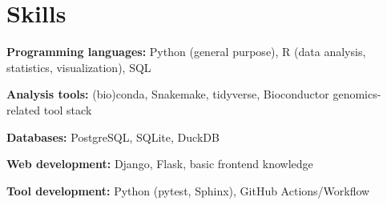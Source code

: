 \section{Skills}

\begin{entrylist}[itemsep=0.5ex]

\item \textbf{Programming languages:}
    Python (general purpose),
    R (data analysis, statistics, visualization),
    SQL

\item \textbf{Analysis tools:} (bio)conda, Snakemake, tidyverse, Bioconductor genomics-related tool stack

\item \textbf{Databases:} PostgreSQL, SQLite, DuckDB

\item \textbf{Web development:} Django, Flask, basic front\-end knowledge

\item \textbf{Tool development:} Python (pytest, Sphinx), GitHub Actions/Workflow

\end{entrylist}
